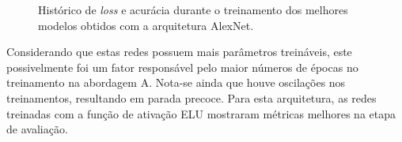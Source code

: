 \begin{figure}[H]
 \centering
 \caption{Histórico de \emph{loss} e acurácia durante o treinamento dos melhores modelos obtidos com a arquitetura AlexNet.}
 \label{fig:treinamento-alexnet}
 \hfill
 \hfill
 \hfill
\end{figure}

Considerando que estas redes possuem mais parâmetros treináveis, este possivelmente foi um fator responsável pelo maior números de épocas no treinamento na abordagem A. Nota-se ainda que houve oscilações nos treinamentos, resultando em parada precoce. Para esta arquitetura, as redes treinadas com a função de ativação ELU mostraram métricas melhores na etapa de avaliação.

